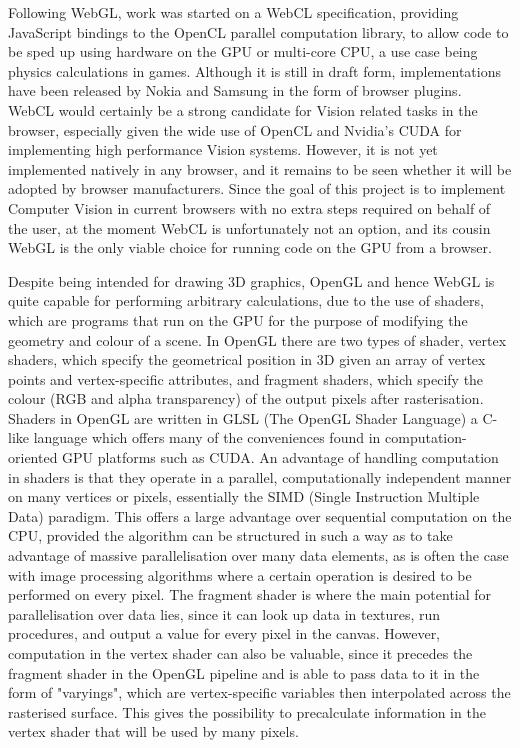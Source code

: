 \documentclass[a4paper]{article}
\begin{document}
Following WebGL, work was started on a WebCL specification, providing JavaScript bindings to the OpenCL parallel computation library, to allow code to be sped up using hardware on the GPU or multi-core CPU, a use case being physics calculations in games. Although it is still in draft form, implementations have been released by Nokia and Samsung in the form of browser plugins. WebCL would certainly be a strong candidate for Vision related tasks in the browser, especially given the wide use of OpenCL and Nvidia's CUDA for implementing high performance Vision systems. However, it is not yet implemented natively in any browser, and it remains to be seen whether it will be adopted by browser manufacturers. Since the goal of this project is to implement Computer Vision in current browsers with no extra steps required on behalf of the user, at the moment WebCL is unfortunately not an option, and its cousin WebGL is the only viable choice for running code on the GPU from a browser.

Despite being intended for drawing 3D graphics, OpenGL and hence WebGL is quite capable for performing arbitrary calculations, due to the use of shaders, which are programs that run on the GPU for the purpose of modifying the geometry and colour of a scene. In OpenGL there are two types of shader, vertex shaders, which specify the geometrical position in 3D given an array of vertex points and vertex-specific attributes, and fragment shaders, which specify the colour (RGB and alpha transparency) of the output pixels after rasterisation. Shaders in OpenGL are written in GLSL (The OpenGL Shader Language) a C-like language which offers many of the conveniences found in computation-oriented GPU platforms such as CUDA. An advantage of handling computation in shaders is that they operate in a parallel, computationally independent manner on many vertices or pixels, essentially the SIMD (Single Instruction Multiple Data) paradigm. This offers a large advantage over sequential computation on the CPU, provided the algorithm can be structured in such a way as to take advantage of massive parallelisation over many data elements, as is often the case with image processing algorithms where a certain operation is desired to be performed on every pixel. The fragment shader is where the main potential for parallelisation over data lies, since it can look up data in textures, run procedures, and output a value for every pixel in the canvas. However, computation in the vertex shader can also be valuable, since it precedes the fragment shader in the OpenGL pipeline and is able to pass data to it in the form of "varyings", which are vertex-specific variables then interpolated across the rasterised surface. This gives the possibility to precalculate information in the vertex shader that will be used by many pixels.
\end{document}
